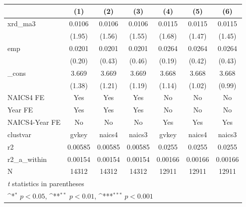 {
\def\sym#1{\ifmmode^{#1}\else\(^{#1}\)\fi}
\begin{tabular}{l*{6}{c}}
\hline\hline
            &\multicolumn{1}{c}{(1)}         &\multicolumn{1}{c}{(2)}         &\multicolumn{1}{c}{(3)}         &\multicolumn{1}{c}{(4)}         &\multicolumn{1}{c}{(5)}         &\multicolumn{1}{c}{(6)}         \\
\hline
xrd\_ma3     &      0.0106         &      0.0106         &      0.0106         &      0.0115         &      0.0115         &      0.0115         \\
            &      (1.95)         &      (1.56)         &      (1.55)         &      (1.68)         &      (1.47)         &      (1.45)         \\
[1em]
emp         &      0.0201         &      0.0201         &      0.0201         &      0.0264         &      0.0264         &      0.0264         \\
            &      (0.20)         &      (0.43)         &      (0.46)         &      (0.19)         &      (0.42)         &      (0.43)         \\
[1em]
\_cons      &       3.669         &       3.669         &       3.669         &       3.668         &       3.668         &       3.668         \\
            &      (1.38)         &      (1.21)         &      (1.19)         &      (1.14)         &      (1.02)         &      (0.99)         \\
[1em]
NAICS4 FE   &         Yes         &         Yes         &         Yes         &          No         &          No         &          No         \\
[1em]
Year FE     &         Yes         &         Yes         &         Yes         &          No         &          No         &          No         \\
[1em]
NAICS4-Year FE&          No         &          No         &          No         &         Yes         &         Yes         &         Yes         \\
\hline
clustvar    &       gvkey         &      naics4         &      naics3         &       gvkey         &      naics4         &      naics3         \\
r2          &     0.00585         &     0.00585         &     0.00585         &      0.0255         &      0.0255         &      0.0255         \\
r2\_a\_within &     0.00154         &     0.00154         &     0.00154         &     0.00166         &     0.00166         &     0.00166         \\
N           &       14312         &       14312         &       14312         &       12911         &       12911         &       12911         \\
\hline\hline
\multicolumn{7}{l}{\footnotesize \textit{t} statistics in parentheses}\\
\multicolumn{7}{l}{\footnotesize \sym{*} \(p<0.05\), \sym{**} \(p<0.01\), \sym{***} \(p<0.001\)}\\
\end{tabular}
}
